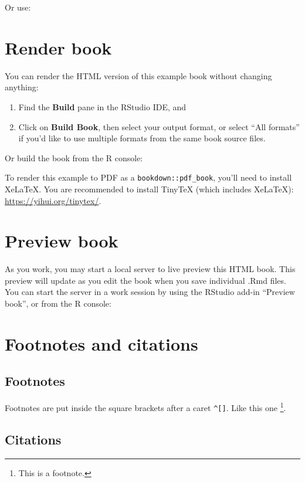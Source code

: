 \documentclass[
]{book}
\theoremstyle{definition}
\theoremstyle{definition}
\theoremstyle{definition}
\theoremstyle{definition}
\theoremstyle{remark}
\begin{document}
Or use:

\hypertarget{render-book}{%
\section{Render book}\label{render-book}}

You can render the HTML version of this example book without changing anything:

\begin{enumerate}
\def\labelenumi{\arabic{enumi}.}
\item
  Find the \textbf{Build} pane in the RStudio IDE, and
\item
  Click on \textbf{Build Book}, then select your output format, or select ``All formats'' if you'd like to use multiple formats from the same book source files.
\end{enumerate}

Or build the book from the R console:

To render this example to PDF as a \texttt{bookdown::pdf\_book}, you'll need to install XeLaTeX. You are recommended to install TinyTeX (which includes XeLaTeX): \url{https://yihui.org/tinytex/}.

\hypertarget{preview-book}{%
\section{Preview book}\label{preview-book}}

As you work, you may start a local server to live preview this HTML book. This preview will update as you edit the book when you save individual .Rmd files. You can start the server in a work session by using the RStudio add-in ``Preview book'', or from the R console:

\hypertarget{footnotes-and-citations-1}{%
\section{Footnotes and citations}\label{footnotes-and-citations-1}}

\hypertarget{footnotes-1}{%
\subsection{Footnotes}\label{footnotes-1}}

Footnotes are put inside the square brackets after a caret \texttt{\^{}{[}{]}}. Like this one \footnote{This is a footnote.}.

\hypertarget{citations-1}{%
\subsection{Citations}\label{citations-1}}
\end{document}
